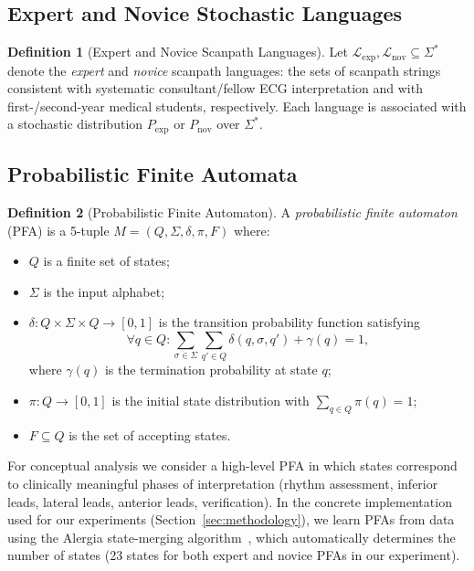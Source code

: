 \documentclass[sigconf]{acmart}
\theoremstyle{plain}
\theoremstyle{definition}
\newtheorem{definition}{Definition}
\begin{document}
\subsection{Expert and Novice Stochastic Languages}

\begin{definition}[Expert and Novice Scanpath Languages]
Let $\mathcal{L}_{\text{exp}}, \mathcal{L}_{\text{nov}} \subseteq \Sigma^*$ denote the \emph{expert} and \emph{novice} scanpath languages: the sets of scanpath strings consistent with systematic consultant/fellow ECG interpretation and with first-/second-year medical students, respectively.
Each language is associated with a stochastic distribution $P_{\text{exp}}$ or $P_{\text{nov}}$ over $\Sigma^*$.
\end{definition}

\subsection{Probabilistic Finite Automata}

\begin{definition}[Probabilistic Finite Automaton]
A \emph{probabilistic finite automaton} (PFA) is a 5-tuple $M = (Q, \Sigma, \delta, \pi, F)$ where:
\begin{itemize}
    \item $Q$ is a finite set of states;
    \item $\Sigma$ is the input alphabet;
    \item $\delta: Q \times \Sigma \times Q \rightarrow [0,1]$ is the transition probability function satisfying
    \begin{equation}
    \forall q \in Q: \sum_{\sigma \in \Sigma} \sum_{q' \in Q} \delta(q, \sigma, q') + \gamma(q) = 1,
    \end{equation}
    where $\gamma(q)$ is the termination probability at state $q$;
    \item $\pi: Q \rightarrow [0,1]$ is the initial state distribution with $\sum_{q \in Q} \pi(q) = 1$;
    \item $F \subseteq Q$ is the set of accepting states.
\end{itemize}
\end{definition}

For conceptual analysis we consider a high-level PFA in which states correspond to clinically meaningful phases of interpretation (rhythm assessment, inferior leads, lateral leads, anterior leads, verification).
In the concrete implementation used for our experiments (Section~\ref{sec:methodology}), we learn PFAs from data using the Alergia state-merging algorithm~\cite{carrasco1994}, which automatically determines the number of states (23 states for both expert and novice PFAs in our experiment).
\end{document}
